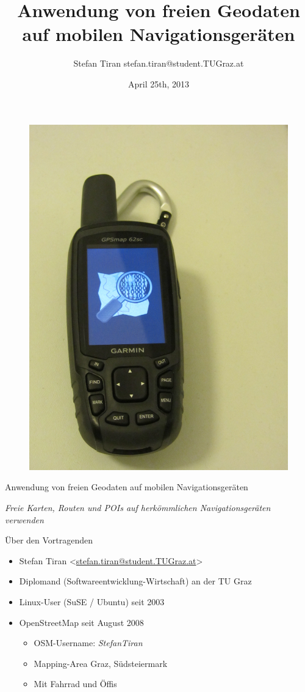 \documentclass{beamer}
\title{Anwendung von freien Geodaten auf mobilen Navigationsgeräten}
\author{Stefan Tiran  stefan.tiran@student.TUGraz.at}
\date{April 25th, 2013}
\begin{document}

\begin{frame}


\begin{figure}
  \centering
  \includegraphics[angle=90,width=.3\textwidth]{IMG_6589.JPG}
\end{figure}

\begin{center}
\Large{Anwendung von freien Geodaten auf mobilen Navigationsgeräten\\}
\end{center}

\begin{center}
{\emph{Freie Karten, Routen und POIs auf herkömmlichen Navigationsgeräten verwenden}}
\end{center}
\end{frame}

\begin{frame}{Über den Vortragenden}

  \begin{itemize}
    \item Stefan Tiran \textless \href{mailto:stefan.tiran@student.TUGraz.at}{stefan.tiran@student.TUGraz.at}\textgreater
    \item Diplomand (Softwareentwicklung-Wirtschaft) an der TU Graz
    \item Linux-User (SuSE / Ubuntu) seit 2003
    \item OpenStreetMap seit August 2008
    \begin{itemize}
      \item OSM-Username: \emph{StefanTiran}
      \item Mapping-Area Graz, Südsteiermark
      \item Mit Fahrrad und Öffis
    \end{itemize}
  \end{itemize}
\end{frame}
\end{document}
